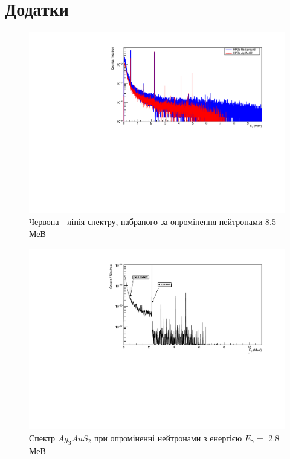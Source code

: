 \documentclass[a4paper, 14pt]{article}
\numberwithin{equation}{section}
\numberwithin{table}{section}
\begin{document}
	
\newpage 
\section{Додатки}
\setcounter{figure}{0}
\begin{figure}[h!]
	\centering \includegraphics[width=1\textwidth]{res/Ag3AuS2_8_5MeVFonClasic.pdf}
	\caption{Червона - лінія спектру, набраного за опромінення нейтронами 8.5 МеВ}
	\label{ris:Ag3AuS28_5MeV}	
\end{figure} 
\begin{figure}[h!]
	\centering \includegraphics[width=1\textwidth]{res/AuAgS28MeV.pdf}
	\caption{ Спектр $Ag_3AuS_2$ при опроміненні нейтронами з енергією $E_{\gamma} = $ 2.8 МеВ}
	\label{ris:Ag3AuS22_8MeV}	
\end{figure}
\end{document}
